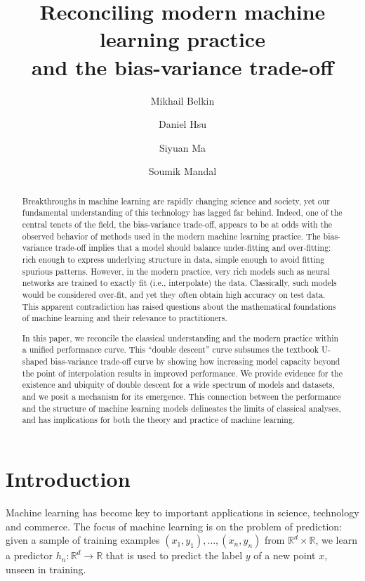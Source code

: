 \documentclass[11pt]{article}
\title{Reconciling modern machine learning practice \\ and the bias-variance trade-off}
\author[a]{Mikhail Belkin}
\author[b]{Daniel Hsu}
\author[a]{Siyuan Ma}
\author[a]{Soumik Mandal}
\affil[a]{The Ohio State University, Columbus, OH}
\affil[b]{Columbia University, New York, NY}
\newcommand{\R}{{\mathbb{R}}}
\begin{document}
 
{\def\thefootnote{}
}

\maketitle

\begin{abstract}
Breakthroughs in machine learning are rapidly changing science and society, yet our fundamental understanding of this technology has lagged far behind.
Indeed, one of the central tenets of the field, the bias-variance trade-off, appears to be at odds with the observed behavior of methods used in the modern machine learning practice.
The bias-variance trade-off implies that a model should balance under-fitting and over-fitting: rich enough to express underlying structure in data, simple enough to avoid fitting spurious patterns.
However, in the modern practice, very rich models such as neural networks are trained to exactly fit (i.e., interpolate) the data.
Classically, such models would be considered over-fit, and yet they often obtain high accuracy on test data.
This apparent contradiction has raised questions about the mathematical foundations of machine learning and their relevance to practitioners.

In this paper, we reconcile the classical understanding and the modern practice within a unified performance curve.
This   ``double descent'' curve  subsumes the textbook U-shaped bias-variance trade-off curve by showing how increasing model capacity beyond the point of interpolation results in improved performance. We provide evidence for the existence and ubiquity of double descent for a wide spectrum of models and datasets, and we posit a mechanism for its emergence. This connection between the performance and the structure of machine learning models delineates the limits of classical analyses, and has implications for both the theory and practice of machine learning.
\end{abstract}

\newpage

\section{Introduction}\label{sec:intro}

Machine learning has become key to important applications in science, technology and commerce.
The focus of machine learning is on the problem of prediction:
given a sample of training examples $(x_1,y_1),\dotsc,(x_n,y_n)$ from $\R^d \times \R$, we learn a predictor $h_n \colon \R^d \to \R$ that is used to predict the label $y$ of a new point $x$, unseen in training.
 
\end{document}
